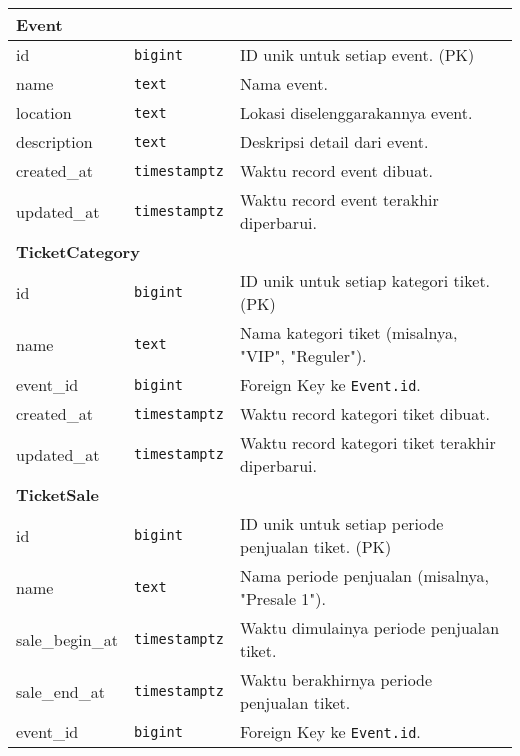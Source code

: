 \begin{longtable}{|l|p{}|p{}|}
	\hline
	\multicolumn{3}{|l|}{\textbf{Event}} \\
	\hline
	id 				& \texttt{bigint} 		& ID unik untuk setiap event. (PK) 																													\\
	\hline
	name 			& \texttt{text} 			& Nama event. 																																		\\
	\hline
	location 		& \texttt{text} 			& Lokasi diselenggarakannya event. 																													\\
	\hline
	description 	& \texttt{text} 			& Deskripsi detail dari event. 																															\\
	\hline
	created\_at 	& \texttt{timestamptz} 	& Waktu record event dibuat. 																															\\
	\hline
	updated\_at 	& \texttt{timestamptz} 	& Waktu record event terakhir diperbarui. 																											\\
	\hline
	\multicolumn{3}{|l|}{\textbf{TicketCategory}} \\
	\hline
	id 				& \texttt{bigint} 		& ID unik untuk setiap kategori tiket. (PK) 																										\\
	\hline
	name 			& \texttt{text} 			& Nama kategori tiket (misalnya, "VIP", "Reguler"). 																								\\
	\hline
	event\_id 		& \texttt{bigint} 		& Foreign Key ke \texttt{Event.id}. 																													\\
	\hline
	created\_at 	& \texttt{timestamptz} 	& Waktu record kategori tiket dibuat. 																												\\
	\hline
	updated\_at 	& \texttt{timestamptz} 	& Waktu record kategori tiket terakhir diperbarui. 																								\\
	\hline
	\multicolumn{3}{|l|}{\textbf{TicketSale}} \\
	\hline
	id 				& \texttt{bigint} 		& ID unik untuk setiap periode penjualan tiket. (PK) 																								\\
	\hline
	name 			& \texttt{text} 			& Nama periode penjualan (misalnya, "Presale 1"). 																									\\
	\hline
	sale\_begin\_at & \texttt{timestamptz} 	& Waktu dimulainya periode penjualan tiket. 																										\\
	\hline
	sale\_end\_at 	& \texttt{timestamptz} 	& Waktu berakhirnya periode penjualan tiket. 																										\\
	\hline
	event\_id 		& \texttt{bigint} 		& Foreign Key ke \texttt{Event.id}. 																													\\

\end{longtable}
